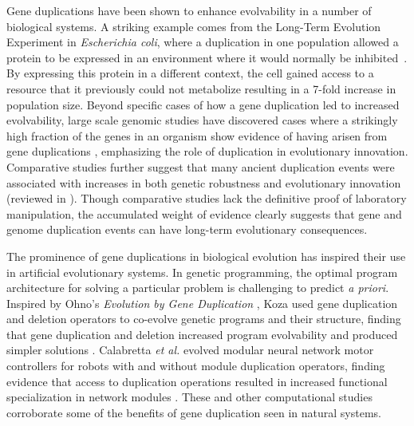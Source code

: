 	Gene duplications have been shown to enhance evolvability in a number of biological systems.  A striking example comes from the Long-Term Evolution Experiment in \textit{Escherichia coli}, where a duplication in one population allowed a protein to be expressed in an environment where it would normally be inhibited~\citep{blount_genomic_2012}.  By expressing this protein in a different context, the cell gained access to a resource that it previously could not metabolize resulting in a 7-fold increase in population size. %
Beyond specific cases of how a gene duplication led to increased evolvability, large scale genomic studies have discovered cases where a strikingly high fraction of the genes in an organism show evidence of having arisen from gene duplications \citep{teichmann_structural_1998,Teichmann:2004cz}, emphasizing the role of duplication in evolutionary innovation.  Comparative studies further suggest that many ancient duplication events were associated with increases in both genetic robustness and evolutionary innovation (reviewed in \citep{wagner_gene_2008}).  Though comparative studies lack the definitive proof of laboratory manipulation, the accumulated weight of evidence clearly suggests that gene and genome duplication events can have long-term evolutionary consequences.

The prominence of gene duplications in biological evolution has inspired their use in artificial evolutionary systems. In genetic programming, the optimal program architecture for solving a particular problem is challenging to predict \textit{a priori}. Inspired by Ohno's \textit{Evolution by Gene Duplication} \citep{ohno1970evolution}, Koza used gene duplication and deletion operators to co-evolve genetic programs and their structure, finding that gene duplication and deletion increased program evolvability and produced simpler solutions \citep{Koza:1995fr}. Calabretta \textit{et al.} evolved modular neural network motor controllers for robots with and without module duplication operators, finding evidence that access to duplication operations resulted in increased functional specialization in network modules \citep{Calabretta:1998vh,Calabretta:2000tl}.
These and other computational studies \citep{Ryan:1998gm,Sawai:1999genetic,Sawai:2000comparative,Schmitt:2005bc} corroborate some of the benefits of gene duplication seen in natural systems.

